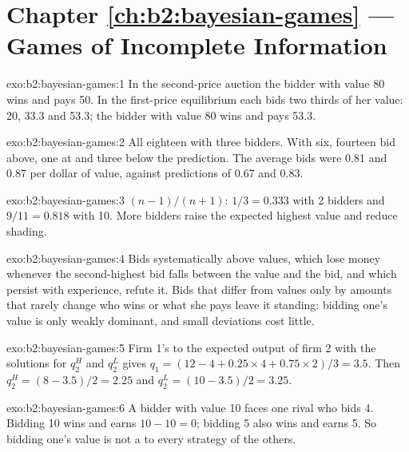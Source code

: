\section*{Chapter \ref{ch:b2:bayesian-games} --- Games of Incomplete Information}

\begin{solution}{exo:b2:bayesian-games:1}
In the second-price auction the bidder with value 80 wins and pays 50. In the first-price equilibrium each bids two thirds of
her value: 20, 33.3 and 53.3; the bidder with value 80 wins and pays 53.3.
\end{solution}

\begin{solution}{exo:b2:bayesian-games:2}
All eighteen with three bidders. With six, fourteen bid above, one at and three below the prediction. The average bids
were 0.81 and 0.87 per dollar of value, against predictions of 0.67 and 0.83.
\end{solution}

\begin{solution}{exo:b2:bayesian-games:3}
$(n - 1)/(n + 1)$: $1/3 = 0.333$ with 2 bidders and $9/11 = 0.818$ with 10. More bidders raise the expected highest value and
reduce shading.
\end{solution}

\begin{solution}{exo:b2:bayesian-games:4}
Bids systematically above values, which lose money whenever the second-highest bid falls between the value and the
bid, and which persist with experience, refute it. Bids that differ from values only by amounts that rarely change who
wins or what she pays leave it standing: bidding one's value is only weakly dominant, and small deviations cost little.
\end{solution}

\begin{solution}{exo:b2:bayesian-games:5}
Firm 1's  to the expected output of firm 2 with the solutions for $q_2^H$ and $q_2^L$ gives $q_1 = (12 - 4 + 0.25 \times 4 +
0.75 \times 2)/3 = 3.5$. Then $q_2^H = (8 - 3.5)/2 = 2.25$ and $q_2^L = (10 - 3.5)/2 = 3.25$.
\end{solution}

\begin{solution}{exo:b2:bayesian-games:6}
A bidder with value 10 faces one rival who bids 4. Bidding 10 wins and earns $10 - 10 = 0$; bidding 5 also wins and earns 5. So
bidding one's value is not a  to every strategy of the others.
\end{solution}

